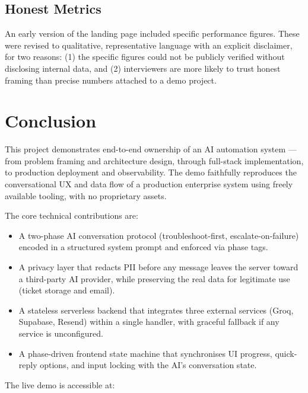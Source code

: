 \documentclass[12pt, a4paper]{article}
\begin{document}
\subsection{Honest Metrics}

An early version of the landing page included specific performance figures. These were
revised to qualitative, representative language with an explicit disclaimer, for two
reasons: (1) the specific figures could not be publicly verified without disclosing
internal data, and (2) interviewers are more likely to trust honest framing than precise
numbers attached to a demo project.

\section{Conclusion}

This project demonstrates end-to-end ownership of an AI automation system --- from problem
framing and architecture design, through full-stack implementation, to production deployment
and observability. The demo faithfully reproduces the conversational UX and data flow of
a production enterprise system using freely available tooling, with no proprietary assets.

The core technical contributions are:

\begin{itemize}[leftmargin=*]
  \item A two-phase AI conversation protocol (troubleshoot-first, escalate-on-failure)
        encoded in a structured system prompt and enforced via phase tags.
  \item A privacy layer that redacts PII before any message leaves the server toward
        a third-party AI provider, while preserving the real data for legitimate use
        (ticket storage and email).
  \item A stateless serverless backend that integrates three external services (Groq,
        Supabase, Resend) within a single handler, with graceful fallback if any service
        is unconfigured.
  \item A phase-driven frontend state machine that synchronises UI progress, quick-reply
        options, and input locking with the AI's conversation state.
\end{itemize}

The live demo is accessible at:
\end{document}
